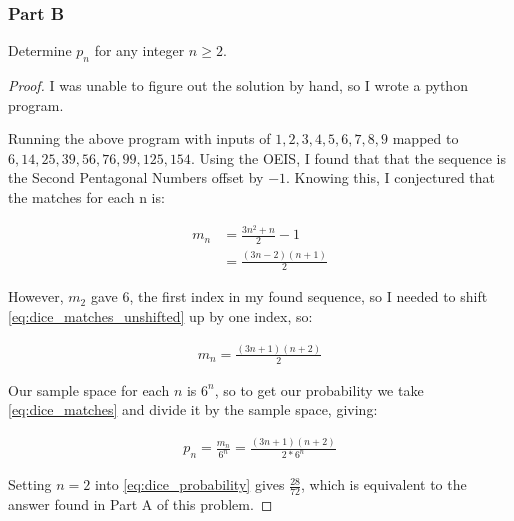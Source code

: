 \subsubsection*{Part B}

Determine $p_n$ for any integer $n \geq 2$.

\begin{proof}
    I was unable to figure out the solution by hand, so I wrote a python program.

    \newpage
    

    Running the above program with inputs of $1, 2, 3, 4, 5, 6, 7, 8, 9$ mapped to $6, 14, 25, 39, 56, 76, 99, 125, 154$. Using the OEIS, I found that that the sequence is the Second Pentagonal Numbers offset by ${-1}$. Knowing this, I conjectured that the matches for each n is:

    \begin{align} \label{eq:dice_matches_unshifted}
        m_n &= \frac{3n^2 + n}{2} - 1 \\
        &= \frac{(3n-2)(n+1)}{2}
    \end{align}

    \newpage

    However, $m_2$ gave 6, the first index in my found sequence, so I needed to shift \ref{eq:dice_matches_unshifted} up by one index, so:

    \begin{align} \label{eq:dice_matches}
        m_n = \frac{(3n+1)(n+2)}{2}
    \end{align}

    Our sample space for each $n$ is $6^n$, so to get our probability we take \ref{eq:dice_matches} and divide it by the sample space, giving:

    \begin{gather} \label{eq:dice_probability}
        p_n = \frac{m_n}{6^n} = \frac{(3n+1)(n+2)}{2 * 6^n}
    \end{gather}

    Setting $n=2$ into \ref{eq:dice_probability} gives $\frac{28}{72}$, which is equivalent to the answer found in Part A of this problem.

\end{proof}